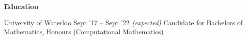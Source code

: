 \documentclass{resume} %
\DeclareRobustCommand{\&}{%
  \ifdim\fontdimen1\font>0pt
    \textsl{\symbol{`\&}}%
  \else
    \symbol{`\&}%
  \fi
}
\begin{document}

\begin{rSection}{\textbf{Education}}
  \begin{rEducationSection}{University of Waterloo}
		     {Sept '17 -- Sept '22 \emph{(expected)}}
		     {Candidate for Bachelors of Mathematics, Honours (Computational Mathematics)}
  \end{rEducationSection}
\end{rSection} 
\end{document}

